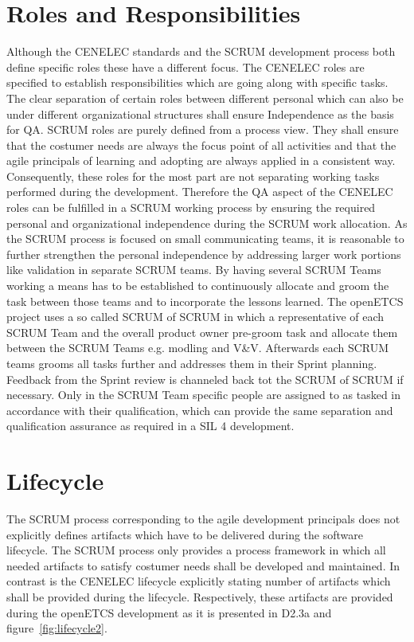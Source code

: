 \section{Roles and Responsibilities}

Although the CENELEC standards and the SCRUM development process both define specific roles these have a different focus. The CENELEC roles are specified to establish responsibilities which are going along with specific tasks. The clear separation of certain roles between different personal which can also be under different organizational structures shall ensure Independence as the basis for QA. SCRUM roles are purely defined from a process view. They shall ensure that the costumer needs are always the focus point of all activities and that the agile principals of learning and adopting are always applied in a consistent way. Consequently, these roles for the most part are not separating working tasks performed during the development.
Therefore the QA aspect of the CENELEC roles can be fulfilled in a SCRUM working process by ensuring the required personal and organizational independence during the SCRUM work allocation. As the SCRUM process is focused on small communicating teams, it is reasonable to further strengthen the personal independence by addressing larger work portions like validation in separate SCRUM teams. By having several SCRUM Teams working a means has to be established to continuously allocate and groom the task between those teams and to incorporate the lessons learned. The openETCS project uses a so called SCRUM of SCRUM in which a representative of each SCRUM Team and the overall product owner pre-groom task and allocate them between the SCRUM Teams e.g. modling and V\&V. Afterwards each SCRUM teams grooms all tasks further and addresses them in their Sprint planning. Feedback from the Sprint review is channeled back tot the SCRUM of SCRUM if necessary. Only in the SCRUM Team specific people are assigned to as tasked in accordance with their qualification, which can provide the same separation and qualification assurance as required in a SIL 4 development.   
 
\section{Lifecycle}
The SCRUM process corresponding to the agile development principals does not explicitly defines artifacts which have to be delivered during the software lifecycle. The SCRUM process only provides a process framework in which all needed artifacts to satisfy costumer needs shall be developed and maintained. In contrast is the CENELEC lifecycle explicitly stating number of artifacts which shall be provided during the lifecycle. Respectively, these artifacts are provided during the openETCS development as it is presented in D2.3a and figure~\ref{fig:lifecycle2}. 

